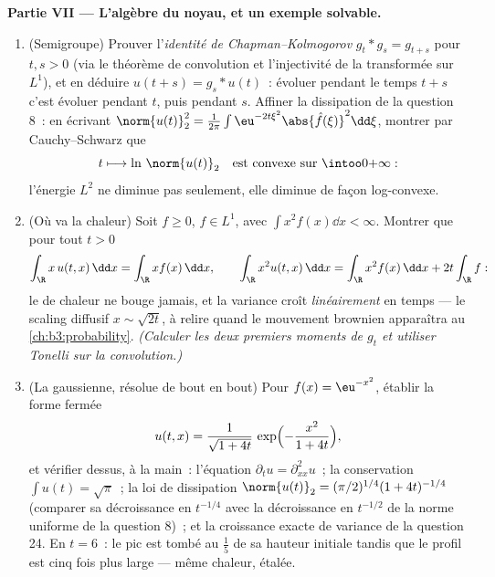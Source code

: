 \begin{problem}[{Problème du week-end --- $\partial_tu =
\partial^2_{xx}u$, résolue de bout en bout}]
\medskip
\noindent\textbf{Partie VII --- L'algèbre du noyau, et un
exemple solvable.}
\begin{enumerate}[resume]
  \item (Semigroupe) Prouver l'\emph{identité de
        Chapman--Kolmogorov} $g_t * g_s = g_{t+s}$ pour $t, s
        > 0$ (via le théorème de convolution et
        l'injectivité de la transformée sur $L^1$), et en
        déduire $u(t + s) = g_s * u(t)$~: évoluer pendant le
        temps $t + s$ c'est évoluer pendant $t$, puis pendant
        $s$. Affiner la dissipation de la question 8~: en
        écrivant $\norm{u(t)}_2^2 = \frac1{2\pi}\int
        \eu^{-2t\xi^2}\abs{\hat f(\xi)}^2\dd\xi$, montrer par
        Cauchy--Schwarz que
        \[
        t \longmapsto \ln\,\norm{u(t)}_2
        \quad\text{est convexe sur } \intoo0{+\infty} :
        \]
        l'énergie $L^2$ ne diminue pas seulement, elle
        diminue de façon log-convexe.
  \item (Où va la chaleur) Soit $f \geq 0$, $f \in L^1$, avec
        $\int x^2f(x)\dd x < \infty$. Montrer que pour tout
        $t > 0$
        \[
        \int_\R x\,u(t, x)\,\dd x = \int_\R x f(x)\,\dd x,
        \qquad
        \int_\R x^2u(t, x)\,\dd x
        = \int_\R x^2f(x)\,\dd x + 2t\int_\R f :
        \]
        le  de chaleur ne bouge jamais, et la variance
        croît \emph{linéairement} en temps --- le scaling
        diffusif $x \sim \sqrt{2t}$, à relire quand le
        mouvement brownien apparaîtra au
        \cref{ch:b3:probability}. \emph{(Calculer les deux
        premiers moments de $g_t$ et utiliser Tonelli sur la
        convolution.)}
  \item (La gaussienne, résolue de bout en bout) Pour $f(x) =
        \eu^{-x^2}$, établir la forme fermée
        \[
        u(t, x) = \frac1{\sqrt{1 + 4t}}\,
        \exp\Bigl(-\frac{x^2}{1 + 4t}\Bigr),
        \]
        et vérifier dessus, à la main~: l'équation
        $\partial_tu = \partial^2_{xx}u$~; la conservation
        $\int u(t) = \sqrt\pi$~; la loi de dissipation
        $\norm{u(t)}_2 = (\pi/2)^{1/4}(1 + 4t)^{-1/4}$
        (comparer sa décroissance en $t^{-1/4}$ avec la
        décroissance en $t^{-1/2}$ de la norme uniforme de
        la question 8)~; et la croissance exacte de variance
        de la question 24. En $t = 6$~: le pic est tombé au
        $\frac15$ de sa hauteur initiale tandis que le
        profil est cinq fois plus large --- même chaleur,
        étalée.
\end{enumerate}
\end{problem}
